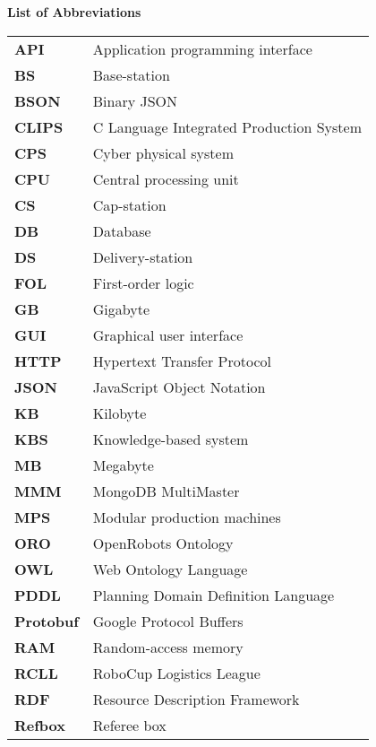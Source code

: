 \newpage

\section*{} 
\vspace{4cm}
\textbf{\noindent \Huge List of Abbreviations}
\vspace{1cm}\\
\begin{tabular}{ll}
\textbf{API} & Application programming interface \\
\textbf{BS} &  Base-station\\
\textbf{BSON} & Binary JSON \\
\textbf{CLIPS} &  C Language Integrated Production System \\
\textbf{CPS} & Cyber physical system \\
\textbf{CPU} & Central processing unit \\
\textbf{CS} &  Cap-station\\
\textbf{DB} & Database \\
\textbf{DS} &  Delivery-station\\
\textbf{FOL} & First-order logic \\
\textbf{GB} & Gigabyte \\
\textbf{GUI} & Graphical user interface \\
\textbf{HTTP} & Hypertext Transfer Protocol \\
\textbf{JSON} & JavaScript Object Notation \\
\textbf{KB} & Kilobyte \\
\textbf{KBS} & Knowledge-based system \\
\textbf{MB} & Megabyte \\
\textbf{MMM} & MongoDB MultiMaster \\
\textbf{MPS} &  Modular production machines\\
\textbf{ORO} & OpenRobots Ontology \\
\textbf{OWL} & Web Ontology Language \\
\textbf{PDDL} & Planning Domain Definition Language \\
\textbf{Protobuf} &  Google Protocol Buffers\\
\textbf{RAM} & Random-access memory \\
\textbf{RCLL} & RoboCup Logistics League \\
\textbf{RDF} & Resource Description Framework \\
\textbf{Refbox} &  Referee box \\

\end{tabular}
